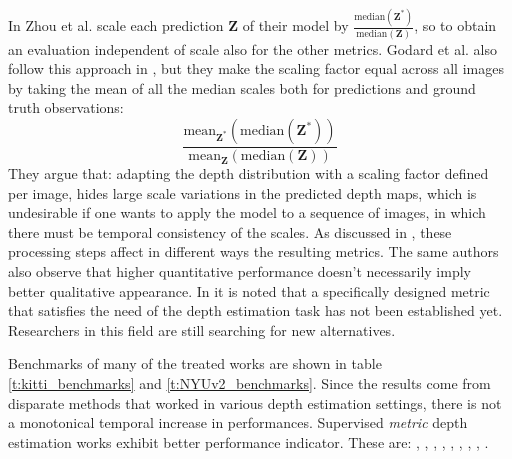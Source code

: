 In \cite{SfMLearner} Zhou et al. scale each prediction $\mathbf{Z}$ of their model by $\frac{\text{median}(\mathbf{Z}^{*})}{\text{median}(\mathbf{Z})}$, so to obtain an evaluation independent of scale also for the other metrics.
Godard et al. also follow this approach in \cite{MonoDepth2}, but they make the scaling factor equal across all images by taking the mean of all the median scales both for predictions and ground truth observations:
\[
	\frac{
		\text{mean}_{\mathbf{Z}^{*}} (\text{median} ( \mathbf{Z}^{*}))
	}{
		\text{mean}_{\mathbf{Z}} (\text{median} ( \mathbf{Z}))
	}
\]
They argue that: adapting the depth distribution with a scaling factor defined per image, hides large scale variations in the predicted depth maps, which is undesirable if one wants to apply the model to a sequence of images, in which there must be temporal consistency of the scales.
As discussed in \cite{evalStudy}, these processing steps affect in different ways the resulting metrics.
The same authors also observe that higher quantitative performance doesn't necessarily imply better qualitative appearance.
In \cite{monocular2024} it is noted that a specifically designed metric that satisfies the need of the depth estimation task has not been established yet.
Researchers in this field are still searching for new alternatives.

\vspace{0.5cm}

Benchmarks of many of the treated works are shown in table \ref{t:kitti_benchmarks} and \ref{t:NYUv2_benchmarks}.
Since the results come from disparate methods that worked in various depth estimation settings, there is not a monotonical temporal increase in performances.
Supervised \textit{metric} depth estimation works exhibit better performance indicator.
These are: \cite{Eigen}, \cite{Eigen2}, \cite{depth_as_classification}, \cite{ordinal_regression}, \cite{denseViT}, \cite{AdaBins}, \cite{Laina}, \cite{LocalBins}, \cite{ZoeDepth}.

